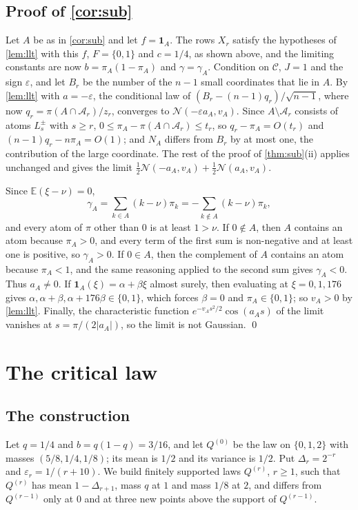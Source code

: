 \documentclass[11pt]{amsart}
\theoremstyle{definition}
\newcommand{\E}{\mathbb{E}}
\newcommand{\Nor}{\mathcal{N}}
\newcommand{\Cond}{\mathcal{C}}
\newcommand{\Ind}{\mathbf{1}}
\begin{document}
\subsection{Proof of \texorpdfstring{\cref{cor:sub}}{Corollary 1.3}}

Let $A$ be as in \cref{cor:sub} and let $f=\Ind_A$. The rows $X_r$ satisfy the hypotheses of \cref{lem:llt} with this $f$, $F=\{0,1\}$ and $c=1/4$, as shown above, and the limiting constants are now $b=\pi_A(1-\pi_A)$ and $\gamma=\gamma_A$. Condition on $\Cond$, $J=1$ and the sign $\varepsilon$, and let $B_r$ be the number of the $n-1$ small coordinates that lie in $A$. By \cref{lem:llt} with $a=-\varepsilon$, the conditional law of $(B_r-(n-1)q_r)/\sqrt{n-1}$, where now $q_r=\pi(A\cap\mathcal A_r)/z_r$, converges to $\Nor(-\varepsilon a_A,v_A)$. Since $A\setminus\mathcal A_r$ consists of atoms $L_s^\pm$ with $s\ge r$, $0\le\pi_A-\pi(A\cap\mathcal A_r)\le t_r$, so $q_r-\pi_A=O(t_r)$ and $(n-1)q_r-n\pi_A=O(1)$; and $N_A$ differs from $B_r$ by at most one, the contribution of the large coordinate. The rest of the proof of \cref{thm:sub}(ii) applies unchanged and gives the limit $\tfrac12\Nor(-a_A,v_A)+\tfrac12\Nor(a_A,v_A)$.

Since $\E(\xi-\nu)=0$,
\[
\gamma_A=\sum_{k\in A}(k-\nu)\pi_k=-\sum_{k\notin A}(k-\nu)\pi_k,
\]
and every atom of $\pi$ other than $0$ is at least $1>\nu$. If $0\notin A$, then $A$ contains an atom because $\pi_A>0$, and every term of the first sum is non-negative and at least one is positive, so $\gamma_A>0$. If $0\in A$, then the complement of $A$ contains an atom because $\pi_A<1$, and the same reasoning applied to the second sum gives $\gamma_A<0$. Thus $a_A\ne0$. If $\Ind_A(\xi)=\alpha+\beta\xi$ almost surely, then evaluating at $\xi=0,1,176$ gives $\alpha,\alpha+\beta,\alpha+176\beta\in\{0,1\}$, which forces $\beta=0$ and $\pi_A\in\{0,1\}$; so $v_A>0$ by \cref{lem:llt}. Finally, the characteristic function $e^{-v_As^2/2}\cos(a_As)$ of the limit vanishes at $s=\pi/(2|a_A|)$, so the limit is not Gaussian. \qed

\section{The critical law}\label{sec:crit}

\subsection{The construction}

Let $q=1/4$ and $b=q(1-q)=3/16$, and let $Q^{(0)}$ be the law on $\{0,1,2\}$ with masses $(5/8,1/4,1/8)$; its mean is $1/2$ and its variance is $1/2$. Put $\Delta_r=2^{-r}$ and $\varepsilon_r=1/(r+10)$. We build finitely supported laws $Q^{(r)}$, $r\ge1$, such that $Q^{(r)}$ has mean $1-\Delta_{r+1}$, mass $q$ at $1$ and mass $1/8$ at $2$, and differs from $Q^{(r-1)}$ only at $0$ and at three new points above the support of $Q^{(r-1)}$.
\end{document}
